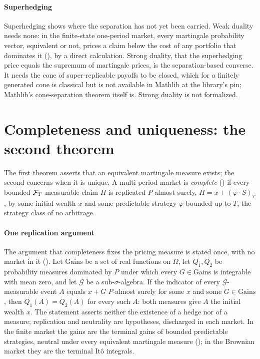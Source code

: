 \documentclass[11pt]{article}
\begin{document}
\paragraph{Superhedging}
Superhedging shows where the separation has not yet been carried. Weak duality needs none: in the finite-state one-period
market, every martingale probability vector, equivalent or not, prices a claim below the cost of any portfolio that dominates it
(), by a direct calculation. Strong duality, that the superhedging price
equals the supremum of martingale prices, is the separation-based converse. It needs the cone of
super-replicable payoffs to be closed, which for a finitely generated cone is classical but is not
available in Mathlib at the library's pin; Mathlib's cone-separation theorem itself is. Strong duality is
not formalized.

\section{Completeness and uniqueness: the second theorem}\label{sec:second}

The first theorem asserts that an equivalent martingale measure exists; the second concerns when it is unique. A multi-period market is
\emph{complete} () if every bounded $\mathcal{F}_T$-measurable claim $H$ is replicated
$P$-almost surely, $H=x+(\varphi\cdot S)_T$, by some initial wealth $x$ and some predictable strategy $\varphi$ bounded up to $T$, the
strategy class of no arbitrage.

\paragraph{One replication argument}
The argument that completeness fixes the pricing measure is stated once, with no market in it
(). Let $\mathrm{Gains}$ be a set of real functions on $\Omega$, let $Q_1,Q_2$ be probability
measures dominated by $P$ under which every $G\in\mathrm{Gains}$ is integrable with mean zero, and let $\mathcal{G}$ be a sub-$\sigma$-algebra. If the
indicator of every $\mathcal{G}$-measurable event $A$ equals $x+G$ $P$-almost surely for some $x$ and some $G\in\mathrm{Gains}$, then
$Q_1(A)=Q_2(A)$ for every such $A$: both measures give $A$ the initial wealth $x$. The statement asserts neither the existence of a hedge
nor of a measure; replication and neutrality are hypotheses, discharged in each market. In the finite market the gains are
the terminal gains of bounded predictable strategies, neutral under every equivalent martingale measure
(); in the Brownian market they are the terminal It\^o integrals.
\end{document}
